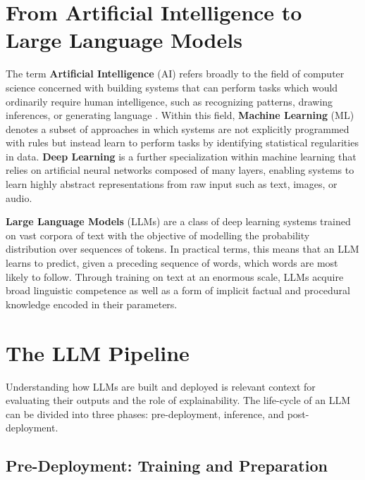 
\section{From Artificial Intelligence to Large Language Models}

The term \textbf{Artificial Intelligence} (AI) refers broadly to the field of computer science concerned with building systems that can perform tasks which would ordinarily require human intelligence, such as recognizing patterns, drawing inferences, or generating language \cite{stoffelbauer_how_2023}. Within this field, \textbf{Machine Learning} (ML) denotes a subset of approaches in which systems are not explicitly programmed with rules but instead learn to perform tasks by identifying statistical regularities in data. \textbf{Deep Learning} is a further specialization within machine learning that relies on artificial neural networks composed of many layers, enabling systems to learn highly abstract representations from raw input such as text, images, or audio.

\textbf{Large Language Models} (LLMs) are a class of deep learning systems trained on vast corpora of text with the objective of modelling the probability distribution over sequences of tokens. In practical terms, this means that an LLM learns to predict, given a preceding sequence of words, which words are most likely to follow. Through training on text at an enormous scale, LLMs acquire broad linguistic competence as well as a form of implicit factual and procedural knowledge encoded in their parameters.

\section{The LLM Pipeline}

Understanding how LLMs are built and deployed is relevant context for evaluating their outputs and the role of explainability. The life-cycle of an LLM can be divided into three phases: pre-deployment, inference, and post-deployment.

\subsection{Pre-Deployment: Training and Preparation}

